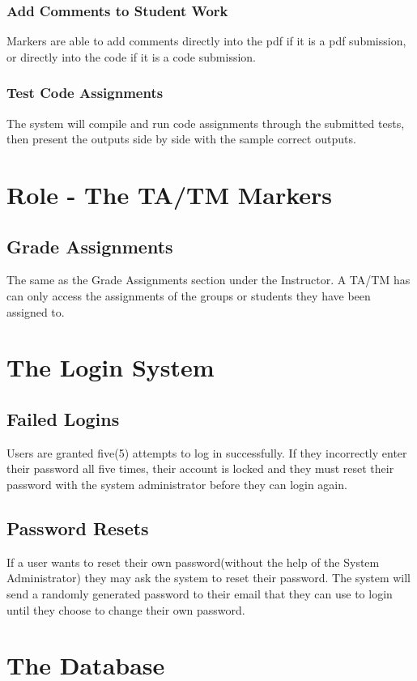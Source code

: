 \documentclass{article}
\begin{document}
\subsubsection{Add Comments to Student Work}
Markers are able to add comments directly into the pdf if it is a pdf submission,
or directly into the code if it is a code submission.
\subsubsection{Test Code Assignments}
The system will compile and run code assignments through the submitted tests,
then present the outputs side by side with the sample correct outputs.

\section{Role - The TA/TM Markers \label{Marker}}
\subsection{Grade Assignments}
The same as the Grade Assignments section under the Instructor.
A TA/TM has can only access the assignments of the groups or students they
have been assigned to.

\section{The Login System}
\subsection{Failed Logins \label{loginSystem1}}
Users are granted five(5) attempts to log in successfully.  If they incorrectly enter their password all five times, their account is locked and they must reset their password with the system administrator before they can login again.
\subsection{Password Resets \label{loginSystem2}}
If a user wants to reset their own password(without the help of the System Administrator) they may ask the system to reset their password.  The system will send a randomly generated password to their email that they can use to login until they choose to change their own password.

\section{The Database}
\end{document}
